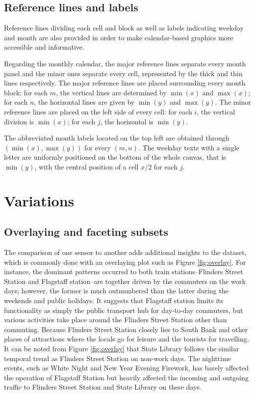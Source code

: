 \documentclass[article]{jss}
\begin{document}
\subsection{Reference lines and
labels}\label{reference-lines-and-labels}

Reference lines dividing each cell and block as well as labels
indicating weekday and month are also provided in order to make
calendar-based graphics more accessible and informative.

Regarding the monthly calendar, the major reference lines separate every
month panel and the minor ones separate every cell, represented by the
thick and thin lines respectively. The major reference lines are placed
surrounding every month block: for each \(m\), the vertical lines are
determined by \(\min{(x)}\) and \(\max{(x)}\); for each \(n\), the
horizontal lines are given by \(\min{(y)}\) and \(\max{(y)}\). The minor
reference lines are placed on the left side of every cell: for each
\(i\), the vertical division is \(\min{(x)}\); for each \(j\), the
horizontal is \(\min{(y)}\).

The abbreviated month labels located on the top left are obtained
through \((\min{(x)}, \max{(y)})\) for every \((m, n)\). The weekday
texts with a single letter are uniformly positioned on the bottom of the
whole canvas, that is \(\min{(y)}\), with the central position of a cell
\(x / 2\) for each \(j\).

\section{Variations}\label{variations}

\label{sec:examples}

\subsection{Overlaying and faceting
subsets}\label{overlaying-and-faceting-subsets}

The comparison of one sensor to another adds additional insights to the
dataset, which is commonly done with an overlaying plot such as Figure
\ref{fig:overlay}. For instance, the dominant patterns occurred to both
train stations--Flinders Street Station and Flagstaff station--are
together driven by the commuters on the work days; however, the former
is much outnumbered than the latter during the weekends and public
holidays. It suggests that Flagstaff station limits its functionality as
simply the public transport hub for day-to-day commuters, but various
activities take place around the Flinders Street Station other than
commuting. Because Flinders Street Station closely lies to South Bank
and other places of attractions where the locals go for leisure and the
tourists for travelling. It can be noted from Figure \ref{fig:overlay}
that State Library follows the similar temporal trend as Flinders Street
Station on non-work days. The nighttime events, such as White Night and
New Year Evening Firework, has barely affected the operation of
Flagstaff Station but heavily affected the incoming and outgoing traffic
to Flinders Street Station and State Library on these days.
\end{document}
